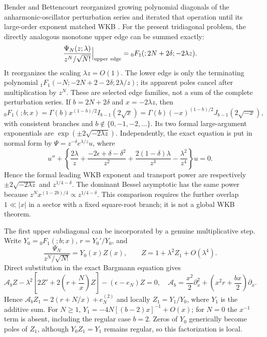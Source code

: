 \documentclass[11pt]{article}
\theoremstyle{remark}
\begin{document}
Bender and Bettencourt reorganized growing polynomial diagonals of the
anharmonic-oscillator perturbation series and iterated that operation until
its large-order exponent matched WKB \cite{BenderBettencourt1996Multiple}.
For the present tridiagonal problem, the directly analogous monotone upper
edge can be summed exactly:
\begin{equation}
 \frac{\Psi_N(z;\lambda)}{z^N/\sqrt{N!}}\Big|_{\rm upper\ edge}
 ={}_0F_1(;2N+2\delta;-2\lambda z).
 \label{eq:weak-drive-0f1}
\end{equation}
It reorganizes the scaling $\lambda z=O(1)$.  The lower edge is only the
terminating polynomial
${}_1F_1(-N;-2N+2-2\delta;2\lambda/z)$; its apparent poles cancel after
multiplication by $z^N$.  These are selected edge families, not a sum of
the complete perturbation series.  If $b=2N+2\delta$ and
$x=-2\lambda z$, then
\begin{equation}
 {}_0F_1(;b;x)=\Gamma(b)x^{(1-b)/2}I_{b-1}(2\sqrt{x})
 =\Gamma(b)(-x)^{(1-b)/2}J_{b-1}(2\sqrt{-x}),
 \label{eq:weak-drive-bessel}
\end{equation}
with consistent branches and $b\notin\{0,-1,-2,\ldots\}$.  Its two formal
large-argument exponentials are
$\exp(\pm2\sqrt{-2\lambda z})$.  Independently, the exact equation is put
in normal form by $\Psi=z^{-\delta}e^{\lambda/z}u$, where
\begin{equation}
 u''+\left\{\frac{2\lambda}{z}
 +\frac{-2\epsilon+\delta-\delta^2}{z^2}
 +\frac{2(1-\delta)\lambda}{z^3}-\frac{\lambda^2}{z^4}\right\}u=0.
 \label{eq:weak-drive-normal-form}
\end{equation}
Hence the formal leading WKB exponent and transport power are respectively
$\pm2\sqrt{-2\lambda z}$ and $z^{1/4-\delta}$.  The dominant Bessel
asymptotic has the same power because
$z^Nx^{(1-2b)/4}\propto z^{1/4-\delta}$.  This comparison requires the
further overlap $1\ll|x|$ in a sector with a fixed square-root branch; it
is not a global WKB theorem.

The first upper subdiagonal can be incorporated by a genuine multiplicative
step.  Write $Y_0={}_0F_1(;b;x)$, $r=Y_0'/Y_0$, and
\begin{equation}
 \frac{\Psi_N}{z^N/\sqrt{N!}}=Y_0(x)Z(x),\qquad
 Z=1+\lambda^2Z_1+O(\lambda^4).
\end{equation}
Direct substitution in the exact Bargmann equation gives
\begin{equation}
 \mathcal A_bZ-\lambda^2\left[2Z'+2\left(r+\frac Nx\right)Z\right]
 -(\epsilon-e_N)Z=0,
 \quad
 \mathcal A_b=\frac{x^2}{2}\partial_x^2+
 \left(x^2r+\frac{bx}{2}\right)\partial_x .
 \label{eq:weak-drive-dressed}
\end{equation}
Hence
$\mathcal A_bZ_1=2(r+N/x)+e_N^{(2)}$ and locally
$Z_1=Y_1/Y_0$, where $Y_1$ is the additive sum.
For $N\ge1$, $Y_1=-4N[(b-2)x]^{-1}+O(x)$; for $N=0$ the
$x^{-1}$ term is absent, including the regular case $b=2$.
Zeros of $Y_0$ generically become poles of $Z_1$, although
$Y_0Z_1=Y_1$ remains regular, so this factorization is local.
\end{document}
